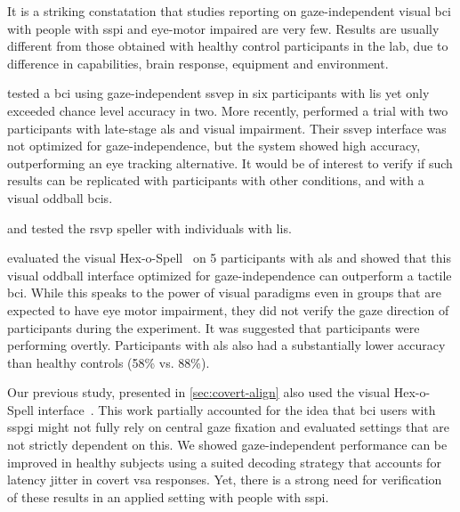 It is a striking constatation that studies reporting on
gaze-independent visual \ac{bci} with people with \ac{sspi} and eye-motor
impaired are very few.
Results are usually different from those obtained with healthy control
participants in the lab, due to difference in capabilities, brain
response, equipment and environment.

\textcite{Lesenfants2014} tested a \ac{bci} using gaze-independent \ac{ssvep} in six
participants with \ac{lis} yet only exceeded chance level accuracy in two.
More recently, \textcite{Peters2020} performed a trial with two
participants with late-stage \ac{als} and visual impairment.
Their \ac{ssvep} interface was not optimized for gaze-independence, but the
system showed high accuracy, outperforming an eye tracking alternative.
It would be of interest to verify if such results can be replicated with
participants with other conditions, and with a visual oddball \acp{bci}.

\textcite{Orhan2012} and \textcite{Oken2014} tested the \ac{rsvp} speller with
individuals with \ac{lis}.

\textcite{Severens2014} evaluated the visual Hex-o-Spell~\cite{Treder2010} on 5
participants with \ac{als} and showed that this visual oddball interface optimized
for gaze-independence can outperform a tactile \ac{bci}.
While this speaks to the power of visual paradigms even in groups that are
expected to have eye motor impairment, they did not verify the gaze direction
of participants during the experiment.
It was suggested that participants were performing overtly.
Participants with \ac{als} also had a substantially lower accuracy than healthy
controls (58\% vs. 88\%).

Our previous study, presented in \cref{sec:covert-align} also used the
visual Hex-o-Spell interface~\cite{VanDenKerchove2024}.
This work partially accounted for the idea that \ac{bci} users with \ac{sspgi} might
not fully rely on central gaze fixation and evaluated settings that are not
strictly dependent on this.
We showed gaze-independent performance can be improved in healthy subjects
using a suited decoding strategy that accounts for latency jitter in covert \ac{vsa} responses.
Yet, there is a strong need for verification of these results in an applied
setting with people with \ac{sspi}.

